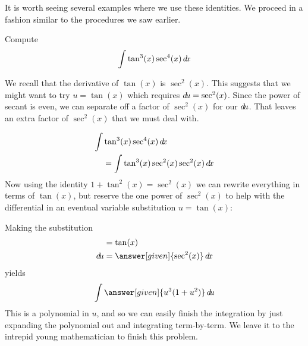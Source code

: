 \documentclass{ximera}
\begin{document}
It is worth seeing several examples where we use these identities. We proceed in a fashion similar to the procedures we saw earlier. 

\begin{example}
  Compute
  \[
  \int \tan^3(x) \sec^4(x) \mathop{}\!d\! x
  \]
  \begin{explanation}
    We recall that the derivative of $\tan(x)$ is $\sec^{2}(x)$. This suggests that we might want to try $u=\tan(x)$ which requires 
    $\mathop{}\!d\! u=\sec^{2}(x)$. 
    Since the power of secant is even, we can separate off a factor of $\sec^{2}(x)$ for our $\mathop{}\!d\! u$. That leaves an extra factor
    of $\sec^{2}(x)$ that we must deal with. 

    \begin{align*}
    \int &\tan^3(x) \sec^4(x) \mathop{}\!d\! x \\
    &= \int\tan^3(x) \sec^2(x) \sec^2(x) \mathop{}\!d\! x
    \end{align*}
    Now using the identity $1+\tan^{2}(x)=\sec^{2}(x)$ we can rewrite everything in
    terms of $\tan(x)$, but reserve the one power of $\sec^2(x)$ to help
    with the differential in an eventual variable substitution $u=\tan(x)$:
    \begin{center}%
    \end{center}
    Making the substitution
    \begin{align*}
       &= \tan(x)\\
      \d u &=\answer[given]{\sec^2(x)} \d x
    \end{align*}
    yields
    \[
    \int \answer[given]{u^3(1+u^2)} \d u
    \]
    This is a polynomial in $u$, and so we can easily finish the
    integration by just expanding the polynomial out and integrating
    term-by-term. We leave it to the intrepid young mathematician to
    finish this problem.
  \end{explanation}
\end{example}
\end{document}

